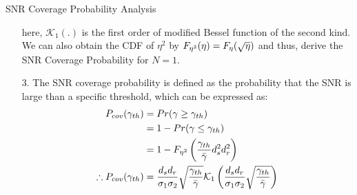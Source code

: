\documentclass{beamer}
\begin{document}
\begin{frame}{SNR Coverage Probability Analysis}
    \begin{block}{}
        \begin{enumerate}
            \item[] here, $\mathcal{K}_1(.)$ is the first order of modified Bessel function of the second kind.\\
            We can also obtain the CDF of $\eta^2$ by $\mathnormal{F}_{\eta^2}(\eta) = \mathnormal{F}_{\eta}(\sqrt{\eta})$ and thus, derive the SNR Coverage Probability for $N=1$.
            \item [3.] The SNR coverage probability is defined as the probability that the SNR is large than a specific threshold, which can be expressed as:
            \begin{align}
                \mathnormal{P}_{cov}(\gamma_{th}) &= \mathnormal{Pr}(\gamma \geq \gamma_{th})\\
                &= 1 - \mathnormal{Pr}(\gamma \leq \gamma_{th})\\
                &= 1 - \mathnormal{F}_{\eta^2}\left(\frac{\gamma_{th}}{\bar\gamma}d_s^2d_r^2\right)\\
                \therefore \mathnormal{P}_{cov}(\gamma_{th}) &= \frac{d_sd_r}{\sigma_1\sigma_2}\sqrt{\frac{\gamma_{th}}{\bar\gamma}}\mathcal{K}_1\left(\frac{d_sd_r}{\sigma_1\sigma_2}\sqrt{\frac{\gamma_{th}}{\bar\gamma}}\right)
            \end{align}
        \end{enumerate}
    \end{block}
\end{frame}
\end{document}
